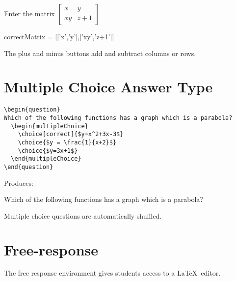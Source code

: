 \documentclass{ximera}
\begin{document}
\begin{question}
  Enter the matrix  \(\begin{bmatrix} x & y \\ xy & z+1 \end{bmatrix}\)
\begin{matrixAnswer}
    correctMatrix = [['x','y'],['xy','z+1']]
\end{matrixAnswer}
\end{question}

\begin{remark}
  The plus and minus buttons add and subtract columns or rows.  
\end{remark}



\section{Multiple Choice Answer Type}

\begin{verbatim}
\begin{question}
Which of the following functions has a graph which is a parabola?
  \begin{multipleChoice}
    \choice[correct]{$y=x^2+3x-3$}
    \choice{$y = \frac{1}{x+2}$}
    \choice{$y=3x+1$}
  \end{multipleChoice}
\end{question}
\end{verbatim}

Produces:

\begin{question}
  Which of the following functions has a graph which is a parabola?
  \begin{multipleChoice}
  \end{multipleChoice}
\end{question}

\begin{remark}
  Multiple choice questions are automatically shuffled.
\end{remark}



\section{Free-response}

The free response environment gives students access to a \LaTeX\ editor. 
\end{document}
